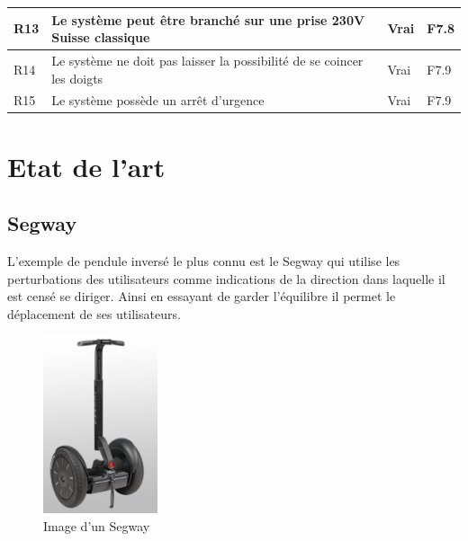 \begin{table}[H]
{\begin{tabular}{|l|l|l|l|}
            R13                                                                                                                     & Le système peut être branché sur une prise 230V Suisse classique        & Vrai                     & F7.8              \\ \hline
            R14                                                                                                                     & Le système ne doit pas laisser la possibilité de se coincer les doigts  & Vrai                     & F7.9              \\ \hline
            R15                                                                                                                     & Le système possède un arrêt d'urgence                                   & Vrai                     & F7.9              \\ \hline
        \end{tabular}%
    }
\end{table}

\section{Etat de l'art}\label{sec:EtatArt}

\subsection{Segway}

L'exemple de pendule inversé le plus connu est le Segway \cite{Segway} qui utilise les perturbations des utilisateurs comme indications de la direction dans laquelle il est censé se diriger. Ainsi en essayant de garder l'équilibre il permet le déplacement de ses utilisateurs.

\begin{figure}[H]
    \centering
    \includegraphics[width = 0.3\textwidth]{assets/figures/Segway.png}
    \caption{Image d'un Segway \cite{Segway}}
    \label{fig:Segway}
\end{figure}

